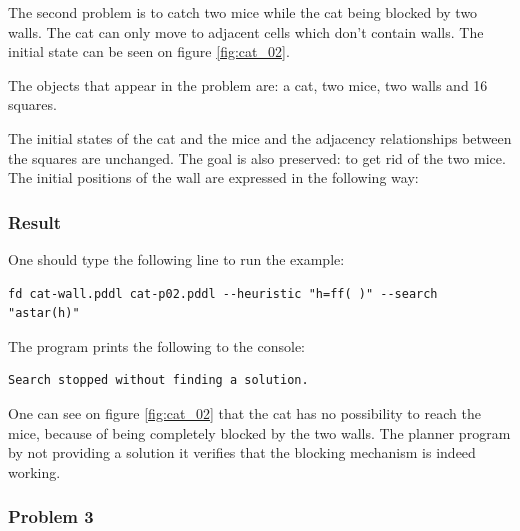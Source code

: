 The second problem is to catch two mice while the cat being blocked by two walls. The cat can only move to adjacent cells which don't contain walls. The initial state can be seen on figure \ref{fig:cat_02}.

The objects that appear in the problem are: a cat, two mice, two walls and 16 squares.



The initial states of the cat and the mice and the adjacency relationships between the squares are unchanged. The goal is also preserved: to get rid of the two mice. The initial positions of the wall are expressed in the following way:




\subsubsection{Result}

One should type the following line to run the example: 

\begin{lstlisting}[numbers=none]
fd cat-wall.pddl cat-p02.pddl --heuristic "h=ff( )" --search "astar(h)"
\end{lstlisting}

The program prints the following to the console:

\begin{lstlisting}[numbers=none]
Search stopped without finding a solution.
\end{lstlisting}

One can see on figure \ref{fig:cat_02} that the cat has no possibility to reach the mice, because of being completely blocked by the two walls. The planner program by not providing a solution it verifies that the blocking mechanism is indeed working.


\subsubsection{Problem 3}

